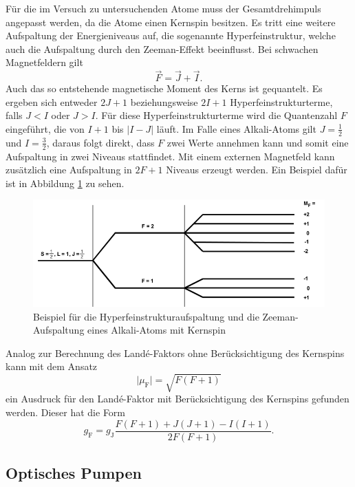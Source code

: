 Für die im Versuch zu untersuchenden Atome muss der Gesamtdrehimpuls angepasst werden, da die Atome einen Kernspin besitzen. Es tritt eine weitere Aufspaltung der Energieniveaus auf, die sogenannte Hyperfeinstruktur,
welche auch die Aufspaltung durch den Zeeman-Effekt beeinflusst. Bei schwachen Magnetfeldern gilt
\begin{equation*}
  \vec F = \vec J + \vec I.
\end{equation*}
Auch das so entstehende magnetische Moment des Kerns ist gequantelt. Es ergeben sich entweder $2J+1$ beziehungsweise $2I+1$ Hyperfeinstrukturterme, falls $J < I$ oder $J > I$.
Für diese Hyperfeinstrukturterme wird die Quantenzahl $F$ eingeführt, die von $I+1$ bis $\vert I-J\vert$ läuft.
Im Falle eines Alkali-Atoms gilt $J=\frac{1}{2}$ und $I=\frac{3}{2}$, daraus folgt direkt, dass $F$ zwei Werte annehmen kann und somit eine Aufspaltung in zwei Niveaus stattfindet.
Mit einem externen Magnetfeld kann zusätzlich eine Aufspaltung in $2F+1$ Niveaus erzeugt werden. Ein Beispiel dafür ist in Abbildung \ref{abb:abb2} zu sehen.
\begin{figure}[H]
	\centering
	\includegraphics[width=12cm]{abb2.jpg}
	\caption{Beispiel für die Hyperfeinstrukturaufspaltung und die Zeeman-Aufspaltung eines Alkali-Atoms mit Kernspin \cite{V21}}
	\label{abb:abb2}
\end{figure}
Analog zur Berechnung des Landé-Faktors ohne Berücksichtigung des Kernspins kann mit dem Ansatz
\begin{equation}
  \big \vert \mu_\text{F} \big \vert = \sqrt{F(F+1)}
\end{equation}
ein Ausdruck für den Landé-Faktor mit Berücksichtigung des Kernspins gefunden werden. Dieser hat die Form
\begin{equation}
  g_\text{F}=g_\text{J}\frac{F(F+1)+J(J+1)-I(I+1)}{2F(F+1)}.
\end{equation}

\subsection{Optisches Pumpen}

